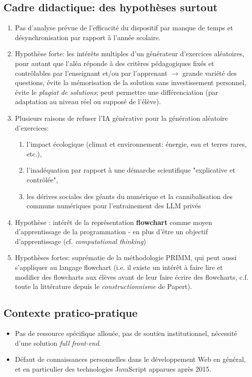 \documentclass[11pt,a4paper]{article}
\begin{document}
\subsection{Cadre didactique: des hypothèses surtout}
\begin{enumerate}
    \item Pas d'analyse prévue de l'efficacité du dispositif par manque de temps et désynchronisation par rapport à l'année scolaire.
    \item Hypothèse forte: les intérêts multiples d'un générateur d'exercices aléatoires, pour autant que  l'aléa réponde à des critères pédagogiques fixés et contrôlables par l'enseignant et/ou par l'apprenant $\rightarrow$ grande variété des questions, évite la mémorisation de la solution sans investissement personnel, évite le \textit{plagiat de solutions}; peut permettre une différenciation (par adaptation au niveau réel ou supposé de l'élève).
    \item Plusieurs raisons de refuser l'IA générative pour la génération aléatoire d'exercices: \begin{enumerate}
        \item l'impact écologique (climat et environnement: énergie, eau et terres rares, etc.), 
        \item l'inadéquation par rapport à une démarche scientifique "explicative et contrôlée", 
        \item les dérives sociales des géants du numérique et la cannibalisation des communs numériques pour l'entrainement des LLM privés
    \end{enumerate}
    \item Hypothèse : intérêt de la représentation \textbf{flowchart} comme moyen d'apprentissage de la programmation - en plus d'être un objectif d'apprentissage (cf. \textit{computational thinking})  
    \item Hypothèses fortes: suprématie de la méthodologie PRIMM, qui peut aussi s'appliquer au langage flowchart (i.e. il existe un intérêt à faire lire et modifier des flowcharts aux élèves avant de leur faire écrire des flowcharts, c.f. toute la littérature depuis le  \textit{constructionnisme} de Papert).

\end{enumerate}

\subsection{Contexte pratico-pratique}
\begin{itemize}
    \item Pas de ressource spécifique allouée, pas de soutien institutionnel, nécessité d'une solution \textit{full front-end}.
    \item Défaut de connaissances personnelles dans le développement Web en général, et en particulier des technologies JavaScript apparues après 2015.
\end{itemize}
\end{document}
